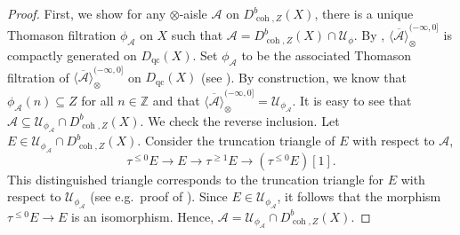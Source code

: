 \documentclass[11pt]{amsart}
\theoremstyle{plain}
\theoremstyle{definition}
\numberwithin{equation}{section}
\numberwithin{theorem}{section}
\begin{document}
\begin{proof}
    First, we show for any $\otimes$-aisle $\mathcal{A}$ on $D^b_{\operatorname{coh},Z}(X)$, there is a unique Thomason filtration $\phi_{\mathcal{A}}$ on $X$ such that $\mathcal{A} = D^b_{\operatorname{coh},Z}(X)\cap\mathcal{U}_\phi$. By \cite[Theorem 3.10]{Hrbek/Lank/LeGros/Pavon:2026}, $\overline{\langle \mathcal{A} \rangle}^{(-\infty,0]}_{\otimes}$ is compactly generated on $D_{\operatorname{qc}}(X)$. Set $\phi_{\mathcal{A}}$ to be the associated Thomason filtration of $\overline{\langle \mathcal{A} \rangle}^{(-\infty,0]}_{\otimes}$ on $D_{\operatorname{qc}}(X)$ (see ). By construction, we know that $\phi_{\mathcal{A}}(n)\subseteq Z$ for all $n\in \mathbb{Z}$ and that $\overline{\langle \mathcal{A} \rangle}^{(-\infty,0]}_{\otimes} = \mathcal{U}_{\phi_{\mathcal{A}}}$. It is easy to see that $\mathcal{A} \subseteq \mathcal{U}_{\phi_{\mathcal{A}}} \cap D^b_{\operatorname{coh},Z}(X)$. We check the reverse inclusion. Let $E\in \mathcal{U}_{\phi_{\mathcal{A}}} \cap D^b_{\operatorname{coh},Z}(X)$. Consider the truncation triangle of $E$ with respect to $\mathcal{A}$,
    \begin{displaymath}
        \tau^{\leq 0} E \to E \to \tau^{\geq 1} E \to (\tau^{\leq 0} E)[1].
    \end{displaymath}
    This distinguished triangle corresponds to the truncation triangle for $E$ with respect to $\mathcal{U}_{\phi_{\mathcal{A}}}$ (see e.g.\ proof of ). Since $E\in \mathcal{U}_{\phi_{\mathcal{A}}}$, it follows that the morphism $\tau^{\leq 0} E \to E$ is an isomorphism. Hence, $\mathcal{A} = \mathcal{U}_{\phi_{\mathcal{A}}} \cap D^b_{\operatorname{coh},Z}(X)$.


\end{proof}
\end{document}
